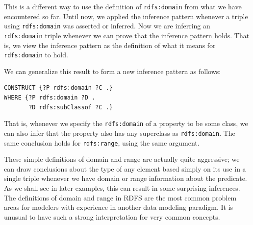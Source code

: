 This is a different way to use the definition of \texttt{rdfs:domain} from what
we have encountered so far. Until now, we applied the inference pattern
whenever a triple using \texttt{rdfs:domain} was asserted or inferred. Now we are
inferring an \texttt{rdfs:domain} triple whenever we can prove that the inference
pattern holds. That is, we view the inference pattern as the definition
of what it means for \texttt{rdfs:domain} to hold.

We can generalize this result to form a new inference pattern as
follows:

\begin{lstlisting}
CONSTRUCT {?P rdfs:domain ?C .}
WHERE {?P rdfs:domain ?D .
       ?D rdfs:subClassof ?C .}
\end{lstlisting}

That is, whenever we specify the \texttt{rdfs:domain} of a property to be some
class, we can also infer that the property also has any superclass as
\texttt{rdfs:domain}. The same conclusion holds for \texttt{rdfs:range}, using the same
argument.

These simple definitions of domain and range are actually quite
aggressive; we can draw conclusions about the type of any element based
simply on its use in a single triple whenever we have domain or range
information about the predicate. As we shall see in later examples, this
can result in some surprising inferences. The definitions of domain and
range in RDFS are the most common problem areas for modelers with
experience in another data modeling paradigm. It is unusual to have such
a strong interpretation for very common concepts.

